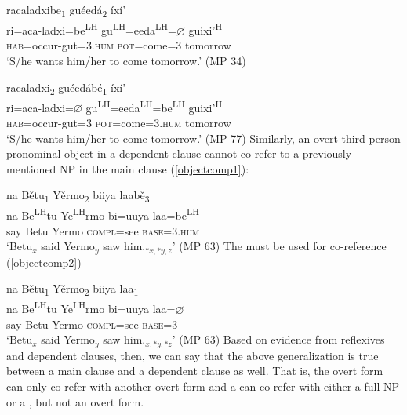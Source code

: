 \ea\label{control3}
\glll racaladxibe\textsubscript{1} gu\'{e}ed\'{a}\textsubscript{2} \'{i}x\'{i}' \\
ri=aca-ladxi=be\textsuperscript{LH}  gu\textsuperscript{LH}=eeda\textsuperscript{LH}={$\varnothing$} guixi'\textsuperscript{H}  \\
\textsc{hab}=occur-gut=\textsc{3.hum} \textsc{pot}=come=\textsc{3} tomorrow \\
\glt `S/he wants him/her to come tomorrow.'  \hfill{(MP 34)}
\z

\ea\label{control4}
\glll racaladxi\textsubscript{2} gu\'{e}ed\'{a}b\'{e}\textsubscript{1} \'{i}x\'{i}' \\
ri=aca-ladxi={$\varnothing$} gu\textsuperscript{LH}=eeda\textsuperscript{LH}=be\textsuperscript{LH}  guixi'\textsuperscript{H}  \\
\textsc{hab}=occur-gut=\textsc{3} \textsc{pot}=come=\textsc{3.hum} tomorrow \\
\glt `S/he wants him/her to come tomorrow.' \hfill{(MP 77)}
\z
Similarly, an overt third-person pronominal object in a dependent clause cannot co-refer to a previously mentioned NP in the main clause (\ref{objectcomp1}):

\ea\label{objectcomp1}
\glll na B\v{e}tu\textsubscript{1} Y\v{e}rmo\textsubscript{2} biiya laab\v{e}\textsubscript{3} \\
na Be\textsuperscript{LH}tu Ye\textsuperscript{LH}rmo bi=uuya laa=be\textsuperscript{LH}  \\
say Betu Yermo \textsc{compl}=see \textsc{base}=\textsc{3.hum} \\
\glt `Betu$_{x}$ said Yermo$_{y}$ saw him.$_{*x, *y, z}$' \hfill{(MP 63)}
\z
The  must be used for co-reference (\ref{objectcomp2})

\ea\label{objectcomp2}
\glll na B\v{e}tu\textsubscript{1} Y\v{e}rmo\textsubscript{2} biiya laa\textsubscript{1} \\
na Be\textsuperscript{LH}tu Ye\textsuperscript{LH}rmo bi=uuya laa={$\varnothing$} \\
say Betu Yermo \textsc{compl}=see \textsc{base}=\textsc{3} \\
\glt `Betu$_{x}$ said Yermo$_{y}$ saw him.$_{x, *y, *z}$' \hfill{(MP 63)}
\z
Based on evidence from reflexives and dependent clauses, then, we can say that the above generalization is true between a main clause and a dependent clause as well. That is, the overt form can only co-refer with another overt form and a  can co-refer with either a full NP or a , but not an overt form.


